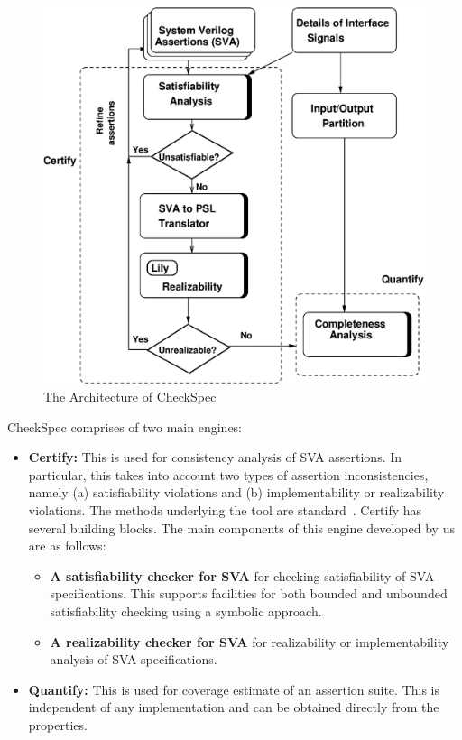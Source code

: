 \documentclass{svmult}
\begin{document}
\begin{figure}[!h]
\centering
\includegraphics[scale=0.45]{fig0.eps}
\caption{The Architecture of CheckSpec} \label{fig0}
\end{figure}
\noindent
CheckSpec comprises of two main engines:

\begin{itemize}

\item {\bf Certify:} This is used for consistency analysis of SVA assertions. 
	In particular, this takes into account two types of assertion 
	inconsistencies, namely (a) satisfiability violations and 
	(b) implementability or realizability violations. The methods 
	underlying the tool are standard~\cite{roadmap}. Certify has 
	several building 
	blocks. The main components of this engine developed by us are as follows:
\begin{itemize}

\item {\bf A satisfiability checker for SVA} for checking satisfiability 
	of SVA specifications. This supports facilities for both bounded and 
	unbounded satisfiability checking using a symbolic approach.
\item {\bf A realizability checker for SVA} for realizability or 
	implementability analysis of SVA specifications. 
\end{itemize}

\item {\bf Quantify:} This is used for coverage estimate of 
	an assertion suite.  This is independent of any implementation 
	and can be obtained directly from the properties. 
\end{itemize}
\end{document}
